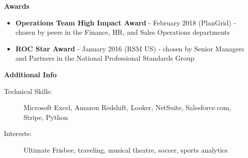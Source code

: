 \documentclass[10pt]{article}
\begin{document}
  {\large \textbf{Awards}}
  \begin{itemize}
    \item  \textbf{Operations Team High Impact Award} - February 2018 (PlanGrid) - chosen by peers in the Finance, HR, and Sales Operations departments
    \item \textbf{ROC Star Award} - January 2016 (RSM US) - chosen by Senior Managers and Partners in the National Professional Standards Group
  \end{itemize}

  {\large \textbf{Additional Info}}

  \begin{description}

    \item[Technical Skills:]
Microsoft Excel, Amazon Redshift, Looker, NetSuite, Salesforce.com, Stripe, Python

    \item[Interests:]
Ultimate Frisbee, traveling, musical theatre, soccer, sports analytics

  \end{description}
\end{document}

